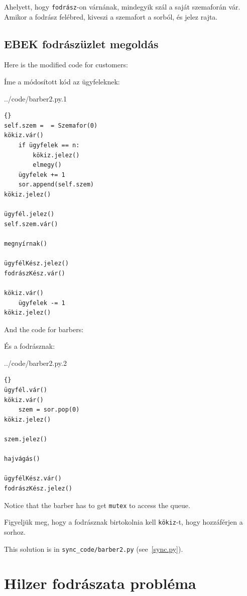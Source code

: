 \documentclass{book}
\newcommand{\clearemptydoublepage}{\newpage\cleardoublepage}
\begin{document}
Ahelyett, hogy {\tt fodrász}-on várnának, mindegyik szál a saját
szemaforán vár. Amikor a fodrász felébred, kiveszi a szemafort a sorból,
és jelez rajta.


\clearemptydoublepage
\subsection{EBEK fodrászüzlet megoldás}

Here is the modified code for customers:

Íme a módosított kód az ügyfeleknek:


{../code/barber2.py.1}

\begin{lstlisting}[title={EBEK fodrászüzlet megoldás (ügyfél)}]{}
self.szem =  = Szemafor(0)
kökiz.vár()
    if ügyfelek == n:
        kökiz.jelez()
        elmegy()
    ügyfelek += 1
    sor.append(self.szem)
kökiz.jelez()

ügyfél.jelez()
self.szem.vár()

megnyírnak()

ügyfélKész.jelez()
fodrászKész.vár()

kökiz.vár()
    ügyfelek -= 1
kökiz.jelez()
\end{lstlisting}

And the code for barbers:

És a fodrásznak:


{../code/barber2.py.2}

\begin{lstlisting}[title={EBEK fodrászüzlet megoldás (fodrász)}]{}
ügyfél.vár()
kökiz.vár()
    szem = sor.pop(0)
kökiz.jelez()

szem.jelez()

hajvágás()

ügyfélKész.vár()
fodrászKész.jelez()
\end{lstlisting}

Notice that the barber has to get {\tt mutex} to access the
queue.

Figyeljük meg, hogy a fodrásznak birtokolnia kell {\tt kökiz}-t,
hogy hozzáférjen a sorhoz.

This solution is in \verb"sync_code/barber2.py" (see~\ref{sync.py}).


\clearemptydoublepage
\section{Hilzer fodrászata probléma}
\end{document}
